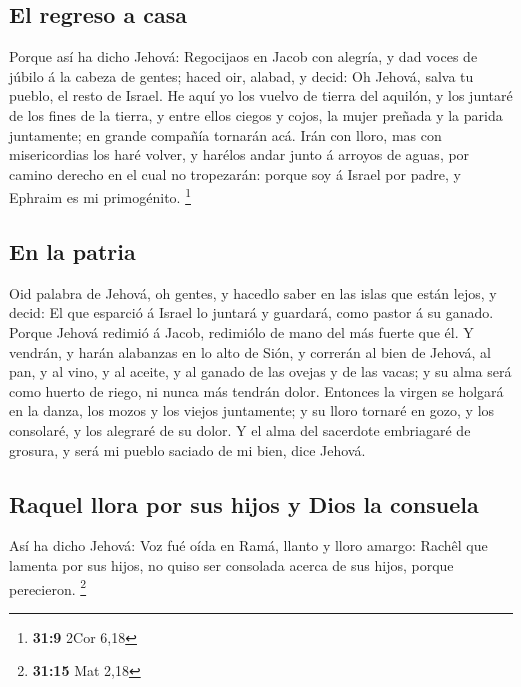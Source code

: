 \hypertarget{el-regreso-a-casa}{%
\subsection{El regreso a casa}\label{el-regreso-a-casa}}

 Porque así ha dicho Jehová: Regocijaos en Jacob con
alegría, y dad voces de júbilo á la cabeza de gentes; haced oir, alabad,
y decid: Oh Jehová, salva tu pueblo, el resto de Israel. 
He aquí yo los vuelvo de tierra del aquilón, y los juntaré de los fines
de la tierra, y entre ellos ciegos y cojos, la mujer preñada y la parida
juntamente; en grande compañía tornarán acá.  Irán con
lloro, mas con misericordias los haré volver, y harélos andar junto á
arroyos de aguas, por camino derecho en el cual no tropezarán: porque
soy á Israel por padre, y Ephraim es mi primogénito. \footnote{\textbf{31:9}
  2Cor 6,18}

\hypertarget{en-la-patria}{%
\subsection{En la patria}\label{en-la-patria}}

 Oid palabra de Jehová, oh gentes, y hacedlo saber en las
islas que están lejos, y decid: El que esparció á Israel lo juntará y
guardará, como pastor á su ganado.  Porque Jehová redimió
á Jacob, redimiólo de mano del más fuerte que él.  Y
vendrán, y harán alabanzas en lo alto de Sión, y correrán al bien de
Jehová, al pan, y al vino, y al aceite, y al ganado de las ovejas y de
las vacas; y su alma será como huerto de riego, ni nunca más tendrán
dolor.  Entonces la virgen se holgará en la danza, los
mozos y los viejos juntamente; y su lloro tornaré en gozo, y los
consolaré, y los alegraré de su dolor.  Y el alma del
sacerdote embriagaré de grosura, y será mi pueblo saciado de mi bien,
dice Jehová.

\hypertarget{raquel-llora-por-sus-hijos-y-dios-la-consuela}{%
\subsection{Raquel llora por sus hijos y Dios la
consuela}\label{raquel-llora-por-sus-hijos-y-dios-la-consuela}}

 Así ha dicho Jehová: Voz fué oída en Ramá, llanto y
lloro amargo: Rachêl que lamenta por sus hijos, no quiso ser consolada
acerca de sus hijos, porque perecieron. \footnote{\textbf{31:15} Mat
  2,18}

